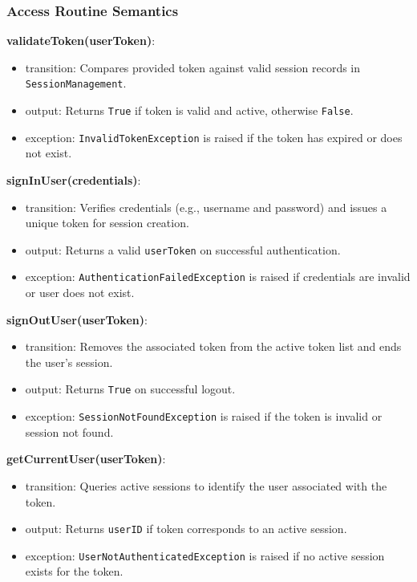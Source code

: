 \documentclass[12pt, titlepage]{article}
\begin{document}
\subsubsection{Access Routine Semantics}

\noindent \textbf{validateToken(userToken)}:
\begin{itemize}
  \item transition: Compares provided token against valid session
    records in \texttt{SessionManagement}.
  \item output: Returns \texttt{True} if token is valid and active,
    otherwise \texttt{False}.
  \item exception: \texttt{InvalidTokenException} is raised if the
    token has expired or does not exist.
\end{itemize}

\noindent \textbf{signInUser(credentials)}:
\begin{itemize}
  \item transition: Verifies credentials (e.g., username and
    password) and issues a unique token for session creation.
  \item output: Returns a valid \texttt{userToken} on successful authentication.
  \item exception: \texttt{AuthenticationFailedException} is raised
    if credentials are invalid or user does not exist.
\end{itemize}

\noindent \textbf{signOutUser(userToken)}:
\begin{itemize}
  \item transition: Removes the associated token from the active
    token list and ends the user’s session.
  \item output: Returns \texttt{True} on successful logout.
  \item exception: \texttt{SessionNotFoundException} is raised if the
    token is invalid or session not found.
\end{itemize}

\noindent \textbf{getCurrentUser(userToken)}:
\begin{itemize}
  \item transition: Queries active sessions to identify the user
    associated with the token.
  \item output: Returns \texttt{userID} if token corresponds to an
    active session.
  \item exception: \texttt{UserNotAuthenticatedException} is raised
    if no active session exists for the token.
\end{itemize}
\end{document}
